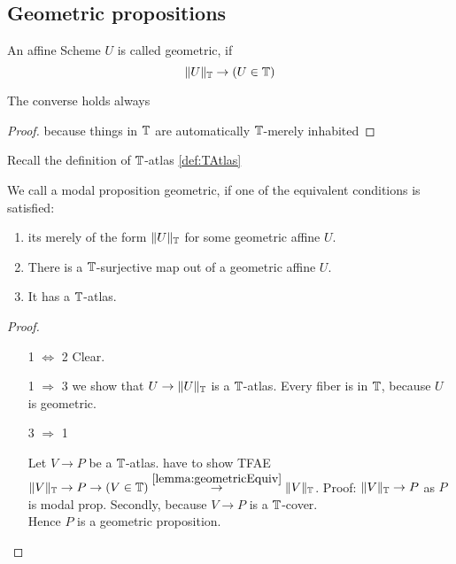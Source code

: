 \subsection{Geometric propositions}
\begin{definition}
	An affine Scheme $U$ is called geometric, if 
	\[\|U\|_{\mathbb{T}} \to (U \in \mathbb{T})\]	
\end{definition}
\begin{lemma}{\label{lemma:geometricEquiv}}
	The converse holds always
\end{lemma}
\begin{proof}
	 because things in $\mathbb{T}$ are automatically $\mathbb{T}$-merely inhabited
\end{proof}
Recall the definition of $\mathbb{T}$-atlas \ref{def:TAtlas}
\begin{definition}{\label{def:algprop}}
	We call a modal proposition geometric, if one of the equivalent conditions is satisfied:
	\begin{enumerate}
		\item  its merely of the form $\|U\|_{\mathbb{T}}$ for some geometric affine $U$.
		\item There is a $\mathbb{T}$-surjective map out of a geometric affine $U$.
		\item It has a $\mathbb{T}$-atlas.
	\end{enumerate}

\end{definition}
\begin{proof} \
	\begin{enumerate}
		\item [1 $\Leftrightarrow$ 2]
		Clear.
		\item [1 $\Rightarrow$ 3]
			we show that $U \to \|U\|_{\mathbb{T}}$ is a $\mathbb{T}$-atlas. Every fiber is in $\mathbb{T}$, because $U$ is geometric.
		\item [3 $\Rightarrow$ 1]
		
				Let $V \to P$ be a $\mathbb{T}$-atlas.
		have to show TFAE $\|V\|_{\mathbb{T}} \to P \to (V \in \mathbb{T}) \overset{\ref{lemma:geometricEquiv}}{\to} \|V\|_{\mathbb{T}}$. 
		Proof: $\|V\|_{\mathbb{T}} \to P$ as $P$ is modal prop. Secondly, because $V \to P$ is a $\mathbb{T}$-cover. \\
		Hence $P$ is a geometric proposition.	
	\end{enumerate}

\end{proof}

